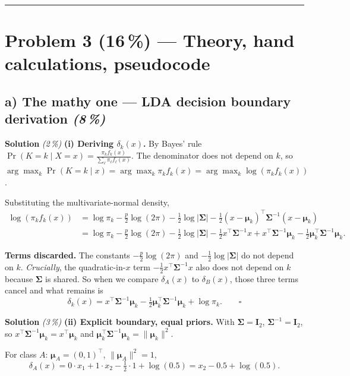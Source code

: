 \documentclass[11pt,a4paper]{article}
\newcommand{\points}[1]{\textbf{(#1\,\%)}}
\newcommand{\subpoints}[1]{\textit{(#1\,\%)}}
\newcommand{\sol}{\noindent\textbf{Solution}}
\begin{document}
\vspace{0.6em}
\hrule
\vspace{1em}

\section*{Problem 3 \points{16} --- Theory, hand calculations, pseudocode}

\subsection*{a) The mathy one --- LDA decision boundary derivation \subpoints{8}}

\sol{} \subpoints{2} \textbf{(i) Deriving $\delta_k(x)$.} By Bayes' rule
$\Pr(K=k\mid X=x) = \frac{\pi_k f_k(x)}{\sum_\ell \pi_\ell f_\ell(x)}$. The denominator does not
depend on $k$, so $\arg\max_k \Pr(K=k\mid x) = \arg\max_k \pi_k f_k(x) = \arg\max_k \log(\pi_k f_k(x))$.

Substituting the multivariate-normal density,
\begin{align*}
\log(\pi_k f_k(x)) &= \log\pi_k - \tfrac{p}{2}\log(2\pi) - \tfrac{1}{2}\log|\bm\Sigma|
   - \tfrac{1}{2}(x-\bm\mu_k)^\top\bm\Sigma^{-1}(x-\bm\mu_k) \\
&= \log\pi_k - \tfrac{p}{2}\log(2\pi) - \tfrac{1}{2}\log|\bm\Sigma|
   - \tfrac{1}{2}x^\top\bm\Sigma^{-1}x
   + x^\top\bm\Sigma^{-1}\bm\mu_k
   - \tfrac{1}{2}\bm\mu_k^\top\bm\Sigma^{-1}\bm\mu_k.
\end{align*}

\textbf{Terms discarded.} The constants $-\tfrac{p}{2}\log(2\pi)$ and $-\tfrac{1}{2}\log|\bm\Sigma|$
do not depend on $k$. \emph{Crucially}, the quadratic-in-$x$ term $-\tfrac{1}{2}x^\top\bm\Sigma^{-1}x$
also does not depend on $k$ because $\bm\Sigma$ is shared. So when we compare $\delta_A(x)$ to
$\delta_B(x)$, those three terms cancel and what remains is
$$\delta_k(x) = x^\top\bm\Sigma^{-1}\bm\mu_k - \tfrac{1}{2}\bm\mu_k^\top\bm\Sigma^{-1}\bm\mu_k + \log\pi_k. \qquad\square$$

\medskip
\sol{} \subpoints{3} \textbf{(ii) Explicit boundary, equal priors.} With $\bm\Sigma = \mathbf I_2$,
$\bm\Sigma^{-1} = \mathbf I_2$, so $x^\top\bm\Sigma^{-1}\bm\mu_k = x^\top\bm\mu_k$ and
$\bm\mu_k^\top\bm\Sigma^{-1}\bm\mu_k = \|\bm\mu_k\|^2$.

For class $A$: $\bm\mu_A = (0,1)^\top$, $\|\bm\mu_A\|^2 = 1$,
$$\delta_A(x) = 0\cdot x_1 + 1\cdot x_2 - \tfrac{1}{2}\cdot 1 + \log(0.5) = x_2 - 0.5 + \log(0.5).$$
\end{document}
